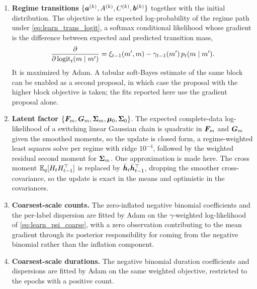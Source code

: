 \begin{enumerate}
\item \textbf{Regime transitions} $\{{\bm{a}}^{(k)}, A^{(k)}, C^{(k)}, {\bm{b}}^{(k)}\}$ together with the
initial distribution. The objective is the expected log-probability of the regime path under
\cref{eq:learn_trans_logit}, a softmax conditional likelihood whose gradient is the difference
between expected and predicted transition mass,
\[
\frac{\partial}{\partial\, \mathrm{logit}_t(m \mid m')}
=
\xi_{t-1}(m',m) - \gamma_{t-1}(m')\, p_t(m \mid m').
\]
It is maximized by Adam. A tabular soft-Bayes estimate of the same block can be enabled as a
second proposal, in which case the proposal with the higher block objective is taken; the fits
reported here use the gradient proposal alone.

\item \textbf{Latent factor} $\{{\bm{F}}_m, {\bm{G}}_m, {\boldsymbol{\Sigma}}_m, {\boldsymbol{\mu}}_0, {\boldsymbol{\Sigma}}_0\}$. The expected
complete-data log-likelihood of a switching linear Gaussian chain is quadratic in ${\bm{F}}_m$ and
${\bm{G}}_m$ given the smoothed moments, so the update is closed form, a regime-weighted least squares
solve per regime with ridge $10^{-4}$, followed by the weighted residual second moment for
${\boldsymbol{\Sigma}}_m$. One approximation is made here. The cross moment $\mathbb{E}_q[H_t H_{t-1}^\top]$ is replaced
by $\bar{{\bm{h}}}_t \bar{{\bm{h}}}_{t-1}^\top$, dropping the smoother cross-covariance, so the update is
exact in the means and optimistic in the covariances.

\item \textbf{Coarsest-scale counts.} The zero-inflated negative binomial coefficients and the
per-label dispersion are fitted by Adam on the $\gamma$-weighted log-likelihood of
\cref{eq:learn_psi_coarse}, with a zero observation contributing to the mean gradient through its
posterior responsibility for coming from the negative binomial rather than the inflation
component.

\item \textbf{Coarsest-scale durations.} The negative binomial duration coefficients and
dispersions are fitted by Adam on the same weighted objective, restricted to the epochs with a
positive count.


\end{enumerate}
